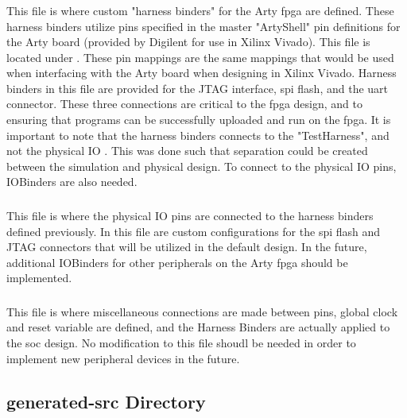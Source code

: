\subsubsection{}\label{sec:Customizing_FPGA-HarnessBinders.scala}
This file is where custom "harness binders" for the Arty \Gls{fpga} are defined. These harness binders utilize pins specified in the master "ArtyShell" pin definitions for the Arty board (provided by Digilent for use in Xilinx Vivado). This file is located under . These pin mappings are the same mappings that would be used when interfacing with the Arty board when designing in Xilinx Vivado. Harness binders in this file are provided for the JTAG interface, \Gls{spi} flash, and the \Gls{uart} connector. These three connections are critical to the \Gls{fpga} design, and to ensuring that programs can be successfully uploaded and run on the \Gls{fpga}. It is important to note that the harness binders connects to the "TestHarness", and not the physical IO \cite{Chipyard_IO}. This was done such that separation could be created between the simulation and physical design. To connect to the physical IO pins, IOBinders are also needed.

\subsubsection{}\label{sec:Customizing_FPGA-IOBinders.scala}
This file is where the physical IO pins are connected to the harness binders defined previously. In this file are custom configurations for the \Gls{spi} flash and JTAG connectors that will be utilized in the default design. In the future, additional IOBinders for other peripherals on the Arty \Gls{fpga} should be implemented.

\subsubsection{}\label{sec:Customizing_FPGA-TestHarness.scala}
This file is where miscellaneous connections are made between pins, global clock and reset variable are defined, and the Harness Binders are actually applied to the \Gls{soc} design. No modification to this file shoudl be needed in order to implement new peripheral devices in the future.

\subsection{generated-src Directory}\label{sec:Customizing_FPGA-Generated-src_Directory}

